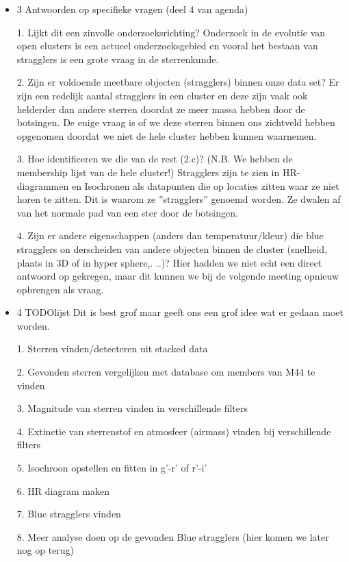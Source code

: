 \documentclass[11pt,a4paper]{article}
\begin{document}
\begin{itemize}
 \item 3 Antwoorden op specifieke vragen (deel 4 van agenda)

 
 1. Lijkt dit een zinvolle onderzoeksrichting?
 Onderzoek in de evolutie van open clusters is een actueel onderzoeksgebied en vooral
 het bestaan van stragglers is een grote vraag in de sterrenkunde.

 
 2. Zijn er voldoende meetbare objecten (stragglers) binnen onze data set?
 Er zijn een redelijk aantal stragglers in een cluster en deze zijn vaak ook helderder dan
 andere sterren doordat ze meer massa hebben door de botsingen. De enige vraag is of
 we deze sterren binnen ons zichtveld hebben opgenomen doordat we niet de hele cluster
 hebben kunnen waarnemen.

 
 3. Hoe identificeren we die van de rest (2.c)? (N.B. We hebben de membership lijst van
 de hele cluster!)
 Stragglers zijn te zien in HR-diagrammen en Isochronen als datapunten die op locaties
 zitten waar ze niet horen te zitten. Dit is waarom ze ”stragglers” genoemd worden. Ze
 dwalen af van het normale pad van een ster door de botsingen.

 
 4. Zijn er andere eigenschappen (anders dan temperatuur/kleur) die blue stragglers on
derscheiden van andere objecten binnen de cluster (snelheid, plaats in 3D of in hyper
sphere,. ..)?
 Hier hadden we niet echt een direct antwoord op gekregen, maar dit kunnen we bij de
 volgende meeting opnieuw opbrengen als vraag.



 
 \item 4 TODOlijst
 Dit is best grof maar geeft ons een grof idee wat er gedaan moet worden.

 
 1. Sterren vinden/detecteren uit stacked data

 
 2. Gevonden sterren vergelijken met database om members van M44 te vinden

 
 3. Magnitude van sterren vinden in verschillende filters

 
 4. Extinctie van sterrenstof en atmosfeer (airmass) vinden bij verschillende filters

 
 5. Isochroon opstellen en fitten in g’-r’ of r’-i’

 
 6. HR diagram maken

 
 7. Blue stragglers vinden

 
 8. Meer analyse doen op de gevonden Blue stragglers (hier komen we later nog op terug)
\end{itemize}
\end{document}
